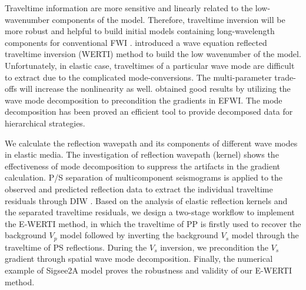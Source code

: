 Traveltime information are more sensitive and linearly related to
the low-wavenumber components of the model. Therefore, traveltime inversion will be more robust and helpful to
build initial models containing long-wavelength components for
conventional FWI \cite[]{Chi2015, Luo2016}.
\cite{Ma2013} introduced a wave equation reflected traveltime inversion (WERTI) method to build the low
wavenumber of the model. 
Unfortunately, in elastic case, traveltimes of a particular wave mode are difficult
to extract due to the complicated mode-conversions. The multi-parameter trade-offs will increase the
nonlinearity as well. \cite{WangEtAl2017} obtained good results by utilizing the wave mode decomposition to precondition the
gradients in EFWI. The mode decomposition has been proved an efficient tool to provide decomposed data for
hierarchical strategies.

We calculate the reflection wavepath and its components of different wave modes in elastic media.
The investigation of reflection wavepath (kernel) shows the effectiveness of mode decomposition to suppress the artifacts
in the gradient calculation.
P/S separation of multicomponent seismograms is applied to the observed and predicted reflection data 
to extract the individual traveltime residuals through DIW \cite[]{Hale2013}.
Based on the analysis of elastic reflection kernels and the separated traveltime residuals, 
we design a two-stage workflow to implement
the E-WERTI method,
in which the traveltime of PP is firstly used to recover the background
$V_p$ model followed by inverting the background $V_s$ model through the traveltime of PS
reflections.
During the $V_s$ inversion, we precondition the $V_s$ gradient through spatial wave mode
decomposition.
Finally, the numerical example of Sigsee2A model proves the robustness and validity of our
E-WERTI method.
